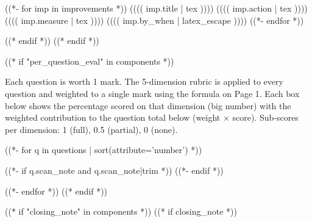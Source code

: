 \documentclass[11pt,a4paper]{article}
\begin{document}
{{{

\begin{tsImprovements}
((*- for imp in improvements *))
        {(((( imp.title | tex ))))}%
        {(((( imp.action | tex ))))}%
        {(((( imp.measure | tex ))))}%
        {(((( imp.by_when | latex_escape ))))}
((*- endfor *))
\end{tsImprovements}
((* endif *))
((* endif *))

((* if "per_question_eval" in components *))
\newpage


{\fontsize{9pt}{12pt}\selectfont\color{tsGrey} Each question is worth 1 mark. The 5-dimension rubric is applied to every question and weighted to a single mark using the formula on Page 1. Each box below shows the percentage scored on that dimension (big number) with the weighted contribution to the question total below (weight $\times$ score). Sub-scores per dimension: 1 (full), 0.5 (partial), 0 (none).}

((*- for q in questions | sort(attribute='number') *))

((*- if q.scan_note and q.scan_note|trim *))
((*- endif *))
((*- endfor *))
((* endif *))

((* if "closing_note" in components *))
((* if closing_note *))
\newpage


}}}
\end{document}

